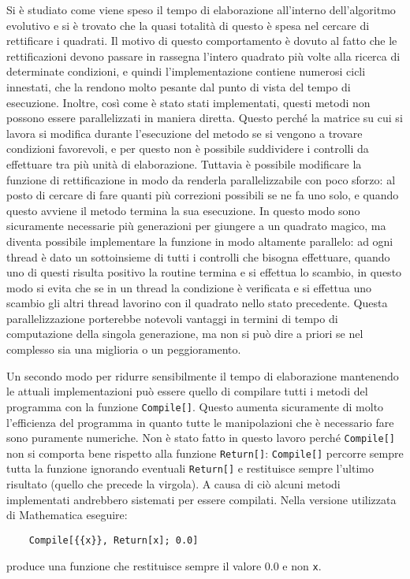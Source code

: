 \documentclass[italian,twoside,twocolumn]{article}
\begin{document}
Si è studiato come viene speso il tempo di elaborazione all'interno dell'algoritmo evolutivo e si è trovato che la quasi totalità di questo è spesa nel cercare di rettificare i quadrati. Il motivo di questo comportamento è dovuto al fatto che le rettificazioni devono passare in rassegna l'intero quadrato più volte alla ricerca di determinate condizioni, e quindi l'implementazione contiene numerosi cicli innestati, che la rendono molto pesante dal punto di vista del tempo di esecuzione. Inoltre, così come è stato stati implementati, questi metodi non possono essere parallelizzati in maniera diretta. Questo perché la matrice su cui si lavora si modifica durante l'esecuzione del metodo se si vengono a trovare condizioni favorevoli, e per questo non è possibile suddividere i controlli da effettuare tra più unità di elaborazione. Tuttavia è possibile modificare la funzione di rettificazione in modo da renderla parallelizzabile con poco sforzo: al posto di cercare di fare quanti più correzioni possibili se ne fa uno solo, e quando questo avviene il metodo termina la sua esecuzione. In questo modo sono sicuramente necessarie più generazioni per giungere a un quadrato magico, ma diventa possibile implementare la funzione in modo altamente parallelo: ad ogni thread è dato un sottoinsieme di tutti i controlli che bisogna effettuare, quando uno di questi risulta positivo la routine termina e si effettua lo scambio, in questo modo si evita che se in un thread la condizione è verificata e si effettua uno scambio gli altri thread lavorino con il quadrato nello stato precedente. Questa parallelizzazione porterebbe notevoli vantaggi in termini di tempo di computazione della singola generazione, ma non si può dire a priori se nel complesso sia una miglioria o un peggioramento. 


Un secondo modo per ridurre sensibilmente il tempo di elaborazione mantenendo le attuali implementazioni può essere quello di compilare tutti i metodi del programma con la funzione \texttt{Compile[]}. Questo aumenta sicuramente di molto l'efficienza del programma in quanto tutte le manipolazioni che è necessario fare sono puramente numeriche. Non è stato fatto in questo lavoro perché \texttt{Compile[]} non si comporta bene rispetto alla funzione \texttt{Return[]}: \texttt{Compile[]} percorre sempre tutta la funzione ignorando eventuali \texttt{Return[]} e restituisce sempre l'ultimo risultato (quello che precede la virgola). A causa di ciò alcuni metodi implementati andrebbero sistemati per essere compilati. Nella versione utilizzata di Mathematica eseguire:
\begin{verbatim}
	Compile[{{x}}, Return[x]; 0.0]
\end{verbatim}
produce una funzione che restituisce sempre il valore 0.0 e non \texttt{x}.
\end{document}
